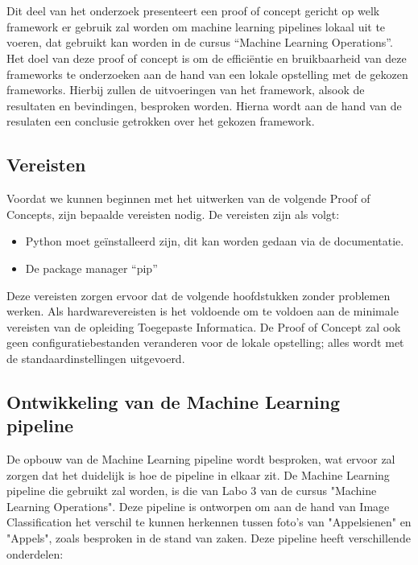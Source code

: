 \chapter{}%
\label{ch:PoC}

Dit deel van het onderzoek presenteert een proof of concept gericht op welk framework er gebruik zal worden om machine learning pipelines lokaal uit te voeren, dat gebruikt kan worden in de cursus ``Machine Learning Operations''.
Het doel van deze proof of concept is om de efficiëntie en bruikbaarheid van deze frameworks te onderzoeken aan de hand van een lokale opstelling met de gekozen frameworks. Hierbij zullen de uitvoeringen van het framework, alsook de resultaten en bevindingen, besproken worden.
Hierna wordt aan de hand van de resulaten een conclusie getrokken over het gekozen framework.
\section{Vereisten}


Voordat we kunnen beginnen met het uitwerken van de volgende Proof of Concepts, zijn bepaalde vereisten nodig. De vereisten zijn als volgt:
\begin{itemize}
    \item Python moet geïnstalleerd zijn, dit kan worden gedaan via de documentatie.
    \item De package manager ``pip''
\end{itemize}
Deze vereisten zorgen ervoor dat de volgende hoofdstukken zonder problemen werken. Als hardwarevereisten is het voldoende om te voldoen aan de minimale vereisten van de opleiding Toegepaste Informatica. De Proof of Concept zal ook geen configuratiebestanden veranderen voor de lokale opstelling; alles wordt met de standaardinstellingen uitgevoerd.
\section{Ontwikkeling van de Machine Learning pipeline}

De opbouw van de Machine Learning pipeline wordt besproken, wat ervoor zal zorgen dat het duidelijk is hoe de pipeline in elkaar zit. De Machine Learning pipeline die gebruikt zal worden, is die van Labo 3 van de cursus "Machine Learning Operations".
Deze pipeline is ontworpen om aan de hand van Image Classification het verschil te kunnen herkennen tussen foto's van "Appelsienen" en "Appels", zoals besproken in de stand van zaken. Deze pipeline heeft verschillende onderdelen:

